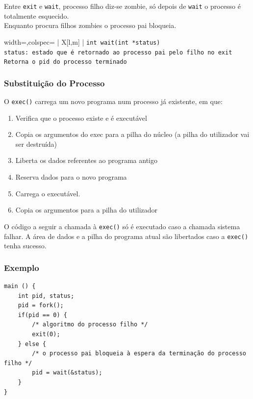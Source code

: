 \documentclass[11pt]{article}
\begin{document}
Entre \lstinline|exit| e \lstinline|wait|, processo filho diz-se zombie, só depois de \lstinline|wait| o processo é totalmente esquecido. \\
Enquanto procura filhos zombies o processo pai bloqueia.

\begin{tblr}{width=\linewidth,colspec={ | X[l,m] | }}
    \hline
    \lstinline|int wait(int *status)|                                             \\\hline
    \lstinline|status: estado que é retornado ao processo pai pelo filho no exit| \\\hline
    \lstinline|Retorna o pid do processo terminado|                               \\\hline
\end{tblr}

\subsubsection{Substituição do Processo}

O \lstinline|exec()| carrega um novo programa num processo já existente, em que:
\begin{enumerate}[topsep=0pt]
    \item Verifica que o processo existe e é executável
    \item Copia os argumentos do exec para a pilha do núcleo (a pilha do utilizador vai ser destruída)
    \item Liberta os dados referentes ao programa antigo
    \item Reserva dados para o novo programa
    \item Carrega o executável.
    \item Copia os argumentos para a pilha do utilizador
\end{enumerate}

O código a seguir a chamada à \lstinline|exec()| só é executado caso a chamada sistema falhar. A área de dados e a pilha do programa atual são libertados caso a \lstinline|exec()| tenha sucesso.

\subsubsection{Exemplo}

\begin{lstlisting}
main () {
    int pid, status;
    pid = fork();
    if(pid == 0) {
        /* algoritmo do processo filho */
        exit(0);
    } else {
        /* o processo pai bloqueia à espera da terminação do processo filho */
        pid = wait(&status);
    }
}
\end{lstlisting}
\end{document}
